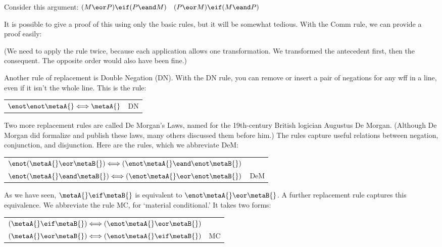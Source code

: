 Consider this argument: $(M \eor P) \eif (P \eand M)$ \therefore\ $(P \eor M) \eif (M \eand P)$

It is possible to give a proof of this using only the basic rules, but it will be somewhat tedious. With the Comm rule, we can provide a proof easily:

\begin{ndproof}
\end{ndproof}

(We need to apply the rule twice, because each application allows one transformation. We transformed the antecedent first, then the consequent. The opposite order would also have been fine.)

Another rule of replacement is Double Negation (DN). With the DN rule, you can remove or insert a pair of negations for any wff in a line, even if it isn't the whole line. This is the rule:

\begin{center}
\begin{tabular}{rl}
$\enot\enot\metaA{} \Longleftrightarrow \metaA{}$ & DN
\end{tabular}
\end{center}

Two more replacement rules  are called De Morgan's Laws, named for the 19th-century British logician Augustus De Morgan. (Although De Morgan did formalize and publish these laws, many others discussed them before him.) The rules capture useful relations between negation, conjunction, and disjunction. Here are the rules, which we abbreviate DeM:

\begin{center}
\begin{tabular}{rl}
$\enot(\metaA{}\eor\metaB{}) \Longleftrightarrow (\enot\metaA{}\eand\enot\metaB{})$\\
$\enot(\metaA{}\eand\metaB{}) \Longleftrightarrow (\enot\metaA{}\eor\enot\metaB{})$
& DeM
\end{tabular}
\end{center}

As we have seen, $\metaA{}\eif\metaB{}$ is equivalent to $\enot\metaA{}\eor\metaB{}$. A further replacement rule captures this equivalence. We abbreviate the rule MC, for `material conditional.' It takes two forms:

\begin{center}
\begin{tabular}{rl}
$(\metaA{}\eif\metaB{}) \Longleftrightarrow (\enot\metaA{}\eor\metaB{})$ &\\
$(\metaA{}\eor\metaB{}) \Longleftrightarrow (\enot\metaA{}\eif\metaB{})$ & MC
\end{tabular}
\end{center}


